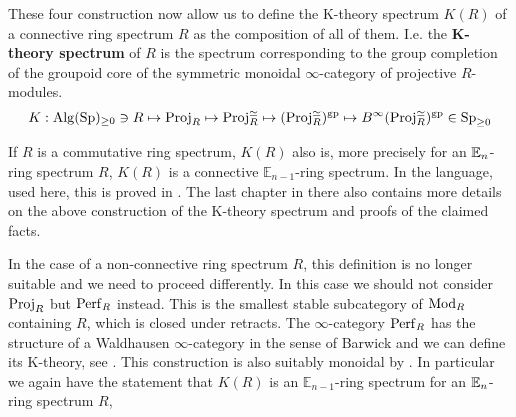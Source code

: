 These four construction now allow us to define the K-theory spectrum $K(R)$ of a connective ring spectrum $R$ as the composition of all of them. I.e. the \textbf{K-theory spectrum} of $R$ is the spectrum corresponding to the group completion of the groupoid core of the symmetric monoidal $\infty$-category of projective $R$-modules. 
\begin{align*}
        K: \operatorname{Alg}(\operatorname{Sp})_{\geq 0}\ni R\mapsto \operatorname{Proj}_R\mapsto \operatorname{Proj}_R^{\simeq}\mapsto (\operatorname{Proj}_R^{\simeq})^{\operatorname{gp}}\mapsto B^{\infty}(\operatorname{Proj}_R^{\simeq})^{\operatorname{gp}}\in \operatorname{Sp}_{\geq 0}
\end{align*}
\begin{rmk}
    If $R$ is a commutative ring spectrum, $K(R)$ also is, more precisely for an $\mathbb{E}_n$-ring spectrum $R$, $K(R)$ is a connective $\mathbb{E}_{n-1}$-ring spectrum. In the language, used here, this is proved in \cite{GGNuniversalityloop}. The last chapter in there also contains more details on the above construction of the K-theory spectrum and proofs of the claimed facts.
\end{rmk}
\begin{rmk}
    In the case of a non-connective ring spectrum $R$, this definition is no longer suitable and we need to proceed differently. In this case we should not consider $\operatorname{Proj}_R$ but $\operatorname{Perf}_R$ instead. This is the smallest stable subcategory of $\operatorname{Mod}_R$ containing $R$, which is closed under retracts. The $\infty$-category $\operatorname{Perf}_R$ has the structure of a Waldhausen $\infty$-category in the sense of Barwick and we can define its K-theory, see \cite[Chapter~11]{barwickK-theory}. This construction is also suitably monoidal by \cite[Proposition~3.8]{barwick2013multiplicative}. In particular we again have the statement that $K(R)$ is an $\mathbb{E}_{n-1}$-ring spectrum for an $\mathbb{E}_n$-ring spectrum $R$, 
\end{rmk}
